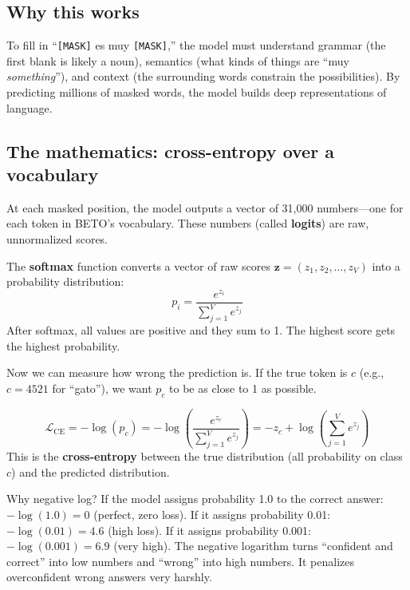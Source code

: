 \documentclass[11pt,a4paper]{article}
\theoremstyle{definition}
\begin{document}
\subsection{Why this works}

To fill in ``\texttt{[MASK]} es muy \texttt{[MASK]},'' the model must
understand grammar (the first blank is likely a noun), semantics (what
kinds of things are ``muy \emph{something}''), and context (the
surrounding words constrain the possibilities). By predicting millions
of masked words, the model builds deep representations of language.

\subsection{The mathematics: cross-entropy over a vocabulary}

At each masked position, the model outputs a vector of 31,000
numbers---one for each token in BETO's vocabulary. These numbers
(called \textbf{logits}) are raw, unnormalized scores.

\begin{mathbox}
The \textbf{softmax} function converts a vector of raw scores
$\mathbf{z} = (z_1, z_2, \ldots, z_V)$ into a probability
distribution:
\[
p_i = \frac{e^{z_i}}{\sum_{j=1}^V e^{z_j}}
\]
After softmax, all values are positive and they sum to 1. The highest
score gets the highest probability.
\end{mathbox}

Now we can measure how wrong the prediction is. If the true token is
$c$ (e.g., $c = 4521$ for ``gato''), we want $p_c$ to be as close to
1 as possible.

\begin{mathbox}
\[
\mathcal{L}_{\text{CE}} = -\log(p_c)
= -\log\!\left(\frac{e^{z_c}}{\sum_{j=1}^V e^{z_j}}\right)
= -z_c + \log\!\left(\sum_{j=1}^V e^{z_j}\right)
\]
This is the \textbf{cross-entropy} between the true distribution
(all probability on class $c$) and the predicted distribution.
\end{mathbox}

\begin{intuition}{Why negative log?}
If the model assigns probability 1.0 to the correct answer:
$-\log(1.0) = 0$ (perfect, zero loss).
If it assigns probability 0.01: $-\log(0.01) = 4.6$ (high loss).
If it assigns probability 0.001: $-\log(0.001) = 6.9$ (very high).
The negative logarithm turns ``confident and correct'' into low
numbers and ``wrong'' into high numbers. It penalizes overconfident
wrong answers very harshly.
\end{intuition}
\end{document}
